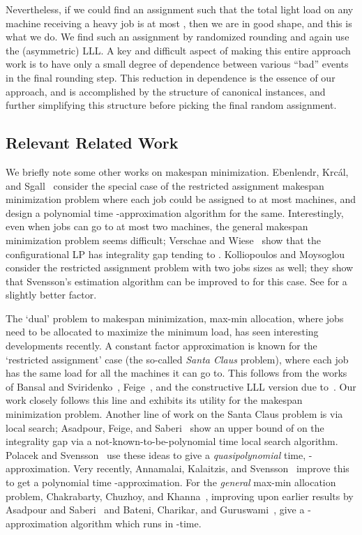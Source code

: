 \documentclass[11pt]{article}
\begin{document}
Nevertheless, if we could find an assignment such that the total light load on any machine receiving a heavy job is at most , then we are in good shape, and this is what we do.
We find such an assignment by randomized rounding and again use the (asymmetric) LLL. A key and difficult aspect of making this entire approach work is to have only a small degree of dependence between various ``bad'' events in the final rounding step. This reduction in dependence is the essence of our approach, and is accomplished by the structure of canonical instances, and further simplifying this structure before picking the final random assignment.

\subsection{Relevant Related Work}
We briefly note some other works on makespan minimization. Ebenlendr, Krc\'{a}l, and Sgall~\cite{EKS08} consider the special case of the restricted assignment makespan minimization problem where each job could be assigned to at most  machines, and design a polynomial time -approximation algorithm for the same. Interestingly, even when jobs can go to at most two machines, the general makespan minimization problem seems difficult; Verschae and Wiese~\cite{VW11} show that the configurational LP has integrality gap tending to . Kolliopoulos and Moysoglou~\cite{KM13} consider the restricted assignment problem with two jobs sizes as well; they show that Svensson's estimation algorithm can be improved to  for this case. See  for a slightly better factor.

The `dual' problem to makespan minimization, max-min allocation, where jobs need to be allocated to maximize the minimum load, has seen interesting developments recently. A constant factor approximation is known for the `restricted assignment' case (the so-called {\em Santa Claus} problem), where each job has the same load for all the machines it can go to. This follows from the works of Bansal and Sviridenko~\cite{BS06}, Feige~\cite{Fei08}, and the constructive LLL version due to~\cite{MT10,HSS11}. Our work closely follows this line and exhibits its utility for the makespan minimization problem. Another line of work on the Santa Claus problem is via local search; Asadpour, Feige, and Saberi~\cite{AFS08} show an upper bound of  on the integrality gap via a not-known-to-be-polynomial time local search algorithm. Polacek and Svensson~\cite{PS12} use these ideas to give a {\em quasipolynomial} time, -approximation. Very recently, Annamalai, Kalaitzis, and Svensson~\cite{AKS15} improve this to get a polynomial time -approximation.
For the {\em general} max-min allocation problem, Chakrabarty, Chuzhoy, and Khanna~\cite{CCK09}, improving upon earlier results by Asadpour and Saberi~\cite{AS07} and Bateni, Charikar, and Guruswami~\cite{BCG09}, give a -approximation algorithm which runs in -time.
\end{document}

